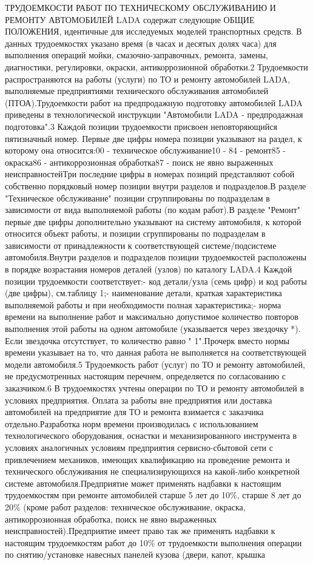 {	
  ТРУДОЕМКОСТИ РАБОТ ПО ТЕХНИЧЕСКОМУ ОБСЛУЖИВАНИЮ И РЕМОНТУ АВТОМОБИЛЕЙ LADA содержат следующие ОБЩИЕ ПОЛОЖЕНИЯ, идентичные для исследуемых моделей транспортных средств.   В данных трудоемкостях указано время (в часах и десятых долях часа) для выполнения операций мойки, сма­зочно-заправочных, ремонта, замены, диагностики, регулировки, окраски, антикоррозионной обработки.2  Трудоемкости  распространяются  на  работы  (услуги)  по  ТО  и  ремонту  автомобилей  LADA,  выполняемые предприятиями технического обслуживания автомобилей (ПТОА).Трудоемкости работ на  предпродажную  подготовку  автомобилей  LADA  приведены в  технологической инст­рукции "Автомобили LADA  -  предпродажная подготовка".3  Каждой позиции трудоемкости присвоен неповторяющийся пятизначный номер.  Первые две цифры номера позиции указывают на раздел, к которому она относится:00 - техническое обслуживание10 - 84 - ремонт85 - окраска86 - антикоррозионная обработка87 - поиск не явно выраженных неисправностейТри последние  цифры в номерах позиций представляют собой собственно порядковый номер позиции внутри разделов и подразделов.В разделе "Техническое обслуживание"  позиции сгруппированы по подразделам в зависимости от вида выпол­няемой работы (по кодам работ).В разделе "Ремонт"  первые две цифры дополнительно указывают на систему автомобиля, к которой относится объект работы, и позиции сгруппированы по подразделам в зависимости от принадлежности к соответствующей системе/подсистеме автомобиля.Внутри разделов и подразделов позиции  трудоемкостей расположены в порядке возрастания номеров деталей (узлов) по каталогу LADA.4 Каждой позиции трудоемкости соответствует:- код детали/узла (семь цифр) и код работы (две цифры), см.таблицу 1;- наименование детали, краткая характеристика выполняемой работы и при необходимости полная характери­стика;- норма времени на выполнение работ и максимально допустимое количество повторов выполнения этой рабо­ты на одном автомобиле (указывается через звездочку *). Если звездочка отсутствует, то количество равно " 1".Прочерк вместо нормы времени указывает на то, что данная работа не выполняется на соответствующей моде­ли автомобиля.5 Трудоемкость работ (услуг) по ТО и ремонту автомобилей, не предусмотренных настоящим перечнем, опре­деляется по согласованию с заказчиком.6 В трудоемкостях учтены операции по ТО и ремонту  автомобилей в условиях предприятия.  Оплата за работы вне предприятия или доставка автомобилей на предприятие для ТО и ремонта взимается с заказчика отдельно.Разработка норм времени производилась с  использованием технологического оборудования, оснастки и меха­низированного инструмента в условиях аналогичных условиям предприятия сервисно-сбытовой сети с привлече­нием  механиков, имеющих квалификацию  на проведение ремонта и технического  обслуживания не  специализи­рующихся на какой-либо конкретной системе автомобиля.Предприятие может применять надбавки к настоящим трудоемкостям  при ремонте  автомобилей старше  5 лет до  10\%, старше 8 лет до 20\% (кроме работ разделов: техническое обслуживание, окраска, антикоррозионная обра­ботка, поиск не явно выраженных неисправностей).Предприятие имеет право так же применять надбавки к настоящим трудоемкостям работ до  10\% от трудоемко­сти выполнения операции по снятию/установке навесных панелей кузова (двери, капот, крышка }
